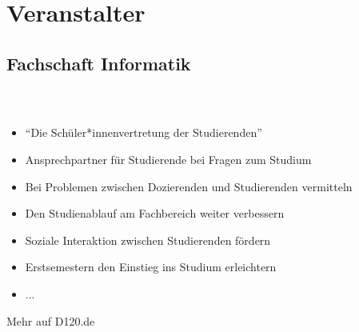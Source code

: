 

\usepackage{listings}
\usepackage{tikz}



\subtitle{Organisatorisches}
\maketitle

\section{Veranstalter}
\subsection*{Fachschaft Informatik}
\begin{frame}
	\frametitle{\insertsectionhead \\ {\small \insertsubsectionhead}}
	\begin{itemize}
		\item "`Die Schüler*innenvertretung der Studierenden"'
		\item Ansprechpartner für Studierende bei Fragen zum Studium
		\item Bei Problemen zwischen Dozierenden und Studierenden vermitteln
		\item Den Studienablauf am Fachbereich weiter verbessern
		\item Soziale Interaktion zwischen Studierenden fördern
		\item Erstsemestern den Einstieg ins Studium erleichtern
		\item ...
	\end{itemize}
\centering
\vspace{3mm}
\huge Mehr auf D120.de
\end{frame}

